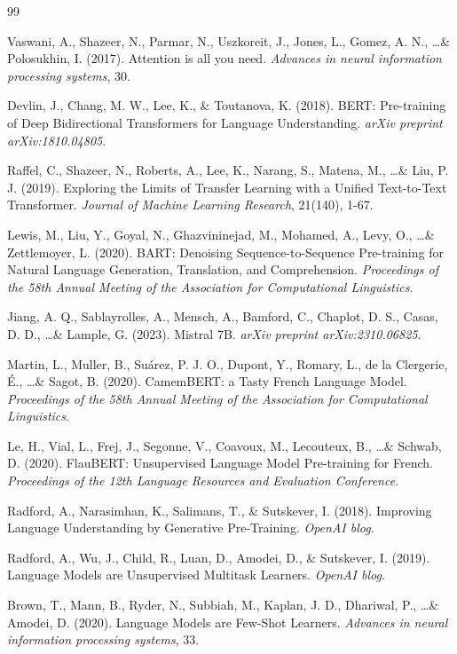 \begin{thebibliography}{99}

Vaswani, A., Shazeer, N., Parmar, N., Uszkoreit, J., Jones, L., Gomez, A. N., \ldots \& Polosukhin, I. (2017). Attention is all you need. \textit{Advances in neural information processing systems}, 30.

Devlin, J., Chang, M. W., Lee, K., \& Toutanova, K. (2018). BERT: Pre-training of Deep Bidirectional Transformers for Language Understanding. \textit{arXiv preprint arXiv:1810.04805}.

Raffel, C., Shazeer, N., Roberts, A., Lee, K., Narang, S., Matena, M., \ldots \& Liu, P. J. (2019). Exploring the Limits of Transfer Learning with a Unified Text-to-Text Transformer. \textit{Journal of Machine Learning Research}, 21(140), 1-67.

Lewis, M., Liu, Y., Goyal, N., Ghazvininejad, M., Mohamed, A., Levy, O., \ldots \& Zettlemoyer, L. (2020). BART: Denoising Sequence-to-Sequence Pre-training for Natural Language Generation, Translation, and Comprehension. \textit{Proceedings of the 58th Annual Meeting of the Association for Computational Linguistics}.

Jiang, A. Q., Sablayrolles, A., Mensch, A., Bamford, C., Chaplot, D. S., Casas, D. D., \ldots \& Lample, G. (2023). Mistral 7B. \textit{arXiv preprint arXiv:2310.06825}.

Martin, L., Muller, B., Suárez, P. J. O., Dupont, Y., Romary, L., de la Clergerie, É., \ldots \& Sagot, B. (2020). CamemBERT: a Tasty French Language Model. \textit{Proceedings of the 58th Annual Meeting of the Association for Computational Linguistics}.

Le, H., Vial, L., Frej, J., Segonne, V., Coavoux, M., Lecouteux, B., \ldots \& Schwab, D. (2020). FlauBERT: Unsupervised Language Model Pre-training for French. \textit{Proceedings of the 12th Language Resources and Evaluation Conference}.

Radford, A., Narasimhan, K., Salimans, T., \& Sutskever, I. (2018). Improving Language Understanding by Generative Pre-Training. \textit{OpenAI blog}.

Radford, A., Wu, J., Child, R., Luan, D., Amodei, D., \& Sutskever, I. (2019). Language Models are Unsupervised Multitask Learners. \textit{OpenAI blog}.

Brown, T., Mann, B., Ryder, N., Subbiah, M., Kaplan, J. D., Dhariwal, P., \ldots \& Amodei, D. (2020). Language Models are Few-Shot Learners. \textit{Advances in neural information processing systems}, 33.

\end{thebibliography}


